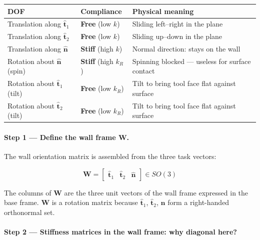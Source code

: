 \begin{center}
\renewcommand{\arraystretch}{1.4}
\begin{tabular}{@{}llp{6cm}@{}}
\toprule
DOF & Compliance & Physical meaning \\
\midrule
Translation along $\hat{\mathbf{t}}_1$
  & \textbf{Free} (low $k$)
  & Sliding left--right in the plane \\
Translation along $\hat{\mathbf{t}}_2$
  & \textbf{Free} (low $k$)
  & Sliding up--down in the plane \\
Translation along $\hat{\mathbf{n}}$
  & \textbf{Stiff} (high $k$)
  & Normal direction: stays on the wall \\
Rotation about $\hat{\mathbf{n}}$ (spin)
  & \textbf{Stiff} (high $k_R$)
  & Spinning blocked --- useless for surface contact \\
Rotation about $\hat{\mathbf{t}}_1$ (tilt)
  & \textbf{Free} (low $k_R$)
  & Tilt to bring tool face flat against surface \\
Rotation about $\hat{\mathbf{t}}_2$ (tilt)
  & \textbf{Free} (low $k_R$)
  & Tilt to bring tool face flat against surface \\
\bottomrule
\end{tabular}
\end{center}

\paragraph{Step 1 --- Define the wall frame $\mathbf{W}$.}
The wall orientation matrix is assembled from the three task vectors:

\begin{equation}
\label{eq:W_matrix}
\mathbf{W} =
\begin{bmatrix}
\hat{\mathbf{t}}_1 & \hat{\mathbf{t}}_2 & \hat{\mathbf{n}}
\end{bmatrix}
\in SO(3)
\end{equation}

The columns of $\mathbf{W}$ are the three unit vectors of the wall frame
expressed in the base frame.
$\mathbf{W}$ is a rotation matrix because $\hat{\mathbf{t}}_1$,
$\hat{\mathbf{t}}_2$, $\hat{\mathbf{n}}$ form a right-handed orthonormal
set.

\paragraph{Step 2 --- Stiffness matrices in the wall frame: why diagonal here?}


